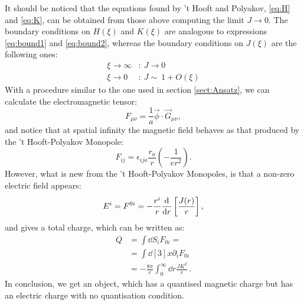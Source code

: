 \documentclass[main.tex]{subfiles}
\begin{document}
 It should be noticed that the equations found by 't Hooft and Polyakov, \ref{eq:H} and \ref{eq:K}, can be obtained from those above computing the limit $J \to 0$.
 The boundary conditions on $H(\xi)$ and $K(\xi)$ are analogous to expressions \ref{eq:bound1} and \ref{eq:bound2}, whereas the boundary conditions on  $J(\xi)$ are the following ones: 
 \begin{subequations}
 \begin{align}
 \xi \to \infty &\colon  \ J \to 0     \label{eq:bound3}\\
 \xi  \to 0   &\colon  \ J \sim \ 1 + O(\xi)  \label{eq:bound4}
  \end{align}
 \end{subequations}
With a procedure similar to the one used in section \ref{sect:Ansatz}, we can calculate the electromagnetic tensor: 
\begin{equation}
 F_{\mu \nu} = \frac{1}{a} \vec{\phi} \cdot \vec{G}_{\mu \nu },
\end{equation}
and notice that at spatial infinity the magnetic field behaves as that produced by the 't Hooft-Polyakov Monopole: 
\begin{equation}
F_{ij}= \epsilon_{ija} \frac{r_a}{r} \left(   - \frac{1}{er^2}    \right).
\end{equation}
However, what is new from the 't Hooft-Polyakov Monopoles, is that a non-zero electric field appears: 
\begin{equation}
E^i = F^{0i}= - \frac{r^i}{r} \dv{}{r} \left[ \frac{J(r)}{r} \right],
\end{equation}
and gives a total charge, which can be written as: 
\begin{equation}
\begin{split}
Q &= \int \dd{S_i}  F_{0i} = \\
  &= \int \dd[3]{x} \partial_i F_{0i}\\
  &= - \frac{8 \pi }{e}\int_0^{\infty} \dd{r} \frac{JK^2}{r}\,.
\end{split}
\end{equation}
In conclusion, we get an object, which has a quantised magnetic charge but has an electric charge with no quantisation condition. 
\end{document}
